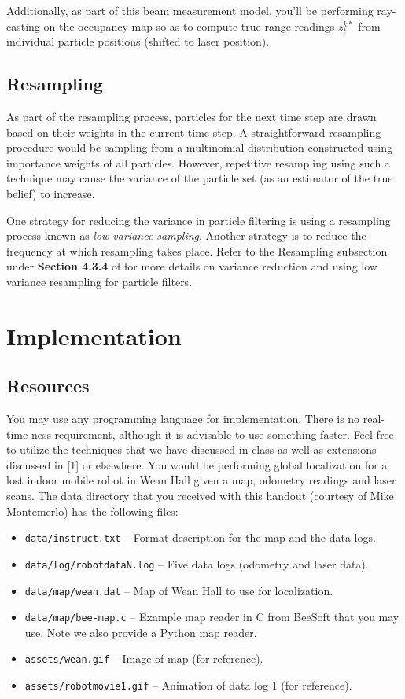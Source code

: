 \documentclass[12pt, a4paper]{article}
\begin{document}
Additionally, as part of this beam measurement model, you'll be performing
ray-casting on the occupancy map so as to compute true range readings
$z^{k*}_t$ from individual particle positions (shifted to laser position).

\subsection*{Resampling}

As part of the resampling process, particles for the next time step
are drawn based on their weights in the current time step. A straightforward
resampling procedure would be sampling from a multinomial distribution
constructed using importance weights of all particles. However, repetitive
resampling using such a technique may cause the variance of the particle
set (as an estimator of the true belief) to increase.

One strategy for reducing the variance in particle filtering is using
a resampling process known as \emph{low variance sampling}. Another
strategy is to reduce the frequency at which resampling takes place.
Refer to the Resampling subsection under \textbf{Section 4.3.4 }of\textbf{
}\cite{thrun2005probabilistic}\textbf{ }for more details on variance
reduction and using low variance resampling for particle filters.


\section{Implementation}

\subsection*{Resources}

You may use any programming language for implementation. There is
no real-time-ness requirement, although it is advisable to use something
faster. Feel free to utilize the techniques that we have
discussed in class as well as extensions discussed in {[}1{]} or elsewhere.
You would be performing global localization for a lost indoor mobile
robot in Wean Hall given a map, odometry readings and laser scans.
The data directory that you received with this handout (courtesy of
Mike Montemerlo) has the following files:
\begin{itemize}
\item \texttt{data/instruct.txt} -- Format description for the map and the
data logs.
\item \texttt{data/log/robotdataN.log} -- Five data logs (odometry and laser
data). 
\item \texttt{data/map/wean.dat} -- Map of Wean Hall to use for localization. 
\item \texttt{data/map/bee-map.c} -- Example map reader in C from BeeSoft that you may use. Note we also provide a Python map reader.
\item \texttt{assets/wean.gif} -- Image of map (for reference). 
\item \texttt{assets/robotmovie1.gif} -- Animation of data log 1 (for reference). 
\end{itemize}
\end{document}
